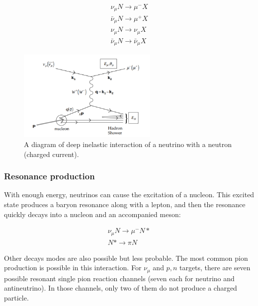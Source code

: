 \begin{align*}
\nu_{\mu} N \rightarrow \mu^{-}X \\
\bar{\nu}_{\mu} N \rightarrow \mu^{+}X \\
\nu_{\mu} N \rightarrow \nu_{\mu}X \\
\bar{\nu}_{\mu} N \rightarrow \bar{\nu}_{\mu}X
\end{align*}

\begin{figure}[H]
\centering
\includegraphics[width=0.6\textwidth]{figures/chapter6/deepinelastic.png}
\caption{A diagram of deep inelastic interaction of a neutrino with a neutron (charged current)\cite{Conrad_1998}.}
\label{fig:deep-inelastic}
\end{figure}

\subsubsection{Resonance production}
\label{sec:RES}

With enough energy, neutrinos can cause the excitation of a nucleon. This excited state produces a baryon resonance along with a lepton, and then the resonance quickly decays into a nucleon and an accompanied meson:

\begin{align*}
\nu_{\mu} N \rightarrow \mu^{-}N* \\
N* \rightarrow \pi N
\end{align*}

  Other decays modes are also possible but less probable. The most common pion production is possible in this interaction. For $\nu_{\mu}$ and $p, n$ targets, there are seven possible resonant single pion reaction channels (seven each for neutrino and antineutrino). In those channels, only two of them do not produce a charged particle.



